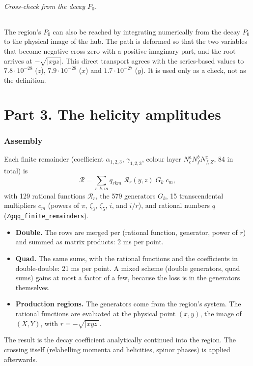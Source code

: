 \documentclass[11pt]{article}
\begin{document}
\paragraph{Cross-check from the decay $P_0$.} The region's $P_0$ can also be reached by integrating numerically from the
decay $P_0$ to the physical image of the hub. The path is deformed so that the two variables that become negative cross
zero with a positive imaginary part, and the root arrives at $-\sqrt{|xyz|}$. This direct transport agrees with the
series-based values to $7.8\cdot10^{-28}$ ($z$), $7.9\cdot10^{-28}$ ($x$) and $1.7\cdot10^{-27}$ ($y$). It is used only
as a check, not as the definition.

\part*{Part 3. The helicity amplitudes}

\section{Assembly}
Each finite remainder (coefficient $\alpha_{1,2,3}$, $\gamma_{1,2,3}$, colour layer $N_c^aN_f^bN_{f,Z}^c$, 84 in
total) is
\[
  \mathcal R=\sum_{r,k,m}q_{rkm}\;\mathcal R_r(y,z)\;G_k\;c_m ,
\]
with 129 rational functions $\mathcal R_r$, the 579 generators $G_k$, 15 transcendental multipliers $c_m$ (powers of
$\pi$, $\zeta_3$, $\zeta_5$, $i$, and $i/r$), and rational numbers $q$ (\texttt{Zgqq\_finite\_remainders}).
\begin{itemize}
\item \textbf{Double.} The rows are merged per (rational function, generator, power of $r$) and summed as matrix
  products: 2 ms per point.
\item \textbf{Quad.} The same sums, with the rational functions and the coefficients in double-double: 21 ms per point.
  A mixed scheme (double generators, quad sums) gains at most a factor of a few, because the loss is in the generators
  themselves.
\item \textbf{Production regions.} The generators come from the region's system. The rational functions are evaluated
  at the physical point $(x,y)$, the image of $(X,Y)$, with $r=-\sqrt{|xyz|}$.
\end{itemize}
The result is the decay coefficient analytically continued into the region. The crossing itself (relabelling momenta
and helicities, spinor phases) is applied afterwards.
\end{document}
